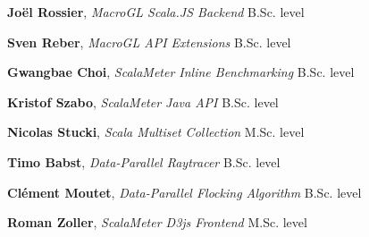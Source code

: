 \documentclass[9pt]{article}
\begin{document}
\bigskip




\medskip
{}

\noindent
{\bf Joël Rossier},
{\em MacroGL Scala.JS Backend}
\newline\noindent B.Sc. level
\medskip

\noindent
{\bf Sven Reber},
{\em MacroGL API Extensions}
\newline\noindent B.Sc. level
\medskip

\noindent
{\bf Gwangbae Choi},
{\em ScalaMeter Inline Benchmarking}
\newline\noindent B.Sc. level
\medskip

\noindent
{\bf Kristof Szabo},
{\em ScalaMeter Java API}
\newline\noindent B.Sc. level
\medskip

\noindent
{\bf Nicolas Stucki},
{\em Scala Multiset Collection}
\newline\noindent M.Sc. level
\medskip

\noindent
{\bf Timo Babst},
{\em Data-Parallel Raytracer}
\newline\noindent B.Sc. level
\medskip

\noindent
{\bf Clément Moutet},
{\em Data-Parallel Flocking Algorithm}
\newline\noindent B.Sc. level
\medskip

\noindent
{\bf Roman Zoller},
{\em ScalaMeter D3js Frontend}
\newline\noindent M.Sc. level
\medskip
\end{document}

